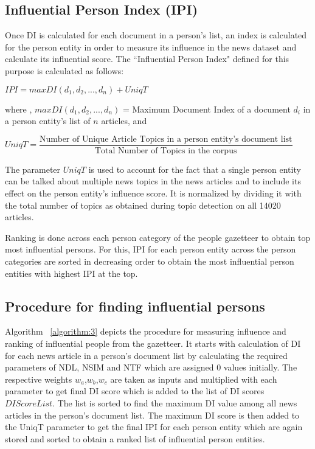 \subsection{Influential Person Index (IPI)}

Once DI is calculated for each document in a person's list, an index is calculated for the person entity in order to measure its influence in the news dataset and calculate its influential score. The ``Influential Person Index" defined for this purpose is calculated as follows:
		
\begin{center}
$IPI= max DI(d_1, d_2, ...,d_n)+ UniqT$
\end{center}

where , $max DI(d_1, d_2, ...,d_n)$ = Maximum Document Index of a document $d_i$ in a person entity's list of  $n$ articles, and
\begin{center} $UniqT = \dfrac{\text{Number of Unique Article Topics in a person entity's document list}}{\text{Total Number of Topics in the corpus}}$\end{center} 

The parameter $UniqT$  is used to account for the fact that a single person entity can be talked about multiple news topics in the news articles and to include its effect on the person entity's influence score. It is normalized by dividing it with the total number of topics as obtained during topic detection on all 14020 articles.

Ranking is done across each person category of the people gazetteer to obtain top most influential persons. For this, IPI for each person entity across the person categories are sorted in decreasing order to obtain the most influential person entities with highest IPI at the top.
  
\subsection{Procedure for finding influential persons}

Algorithm ~\ref{algorithm:3} depicts the procedure for measuring influence and ranking of influential people from the gazetteer. It starts with calculation of DI for each news article in a person's document list by calculating the required parameters of NDL, NSIM and NTF which are assigned 0 values initially. The respective weights $w_a$,$w_b$,$w_c$ are taken as inputs and multiplied with each parameter to get final DI score which is added to the list of DI scores $DIScoreList$. The list is sorted to find the maximum DI value among all news articles in the person's document list. The maximum DI score is then added to the UniqT parameter to get the final IPI for each person entity which are again stored and sorted to obtain a ranked list of influential person entities.  



